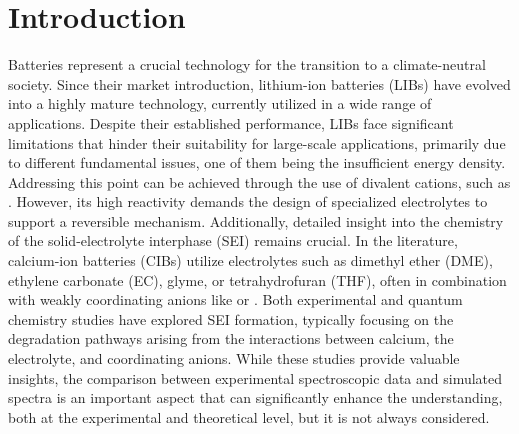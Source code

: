 \documentclass[%
aip,
amsmath,amssymb,
preprint,%
jcp,
showkeys,
]{revtex4-2}
\begin{document}
\clearpage
\section{Introduction}

Batteries represent a crucial technology for the transition to a climate-neutral society. Since their market introduction, lithium-ion batteries (LIBs) have evolved into a highly mature technology, currently utilized in a wide range of applications.\cite{zubiLithiumionBatteryState2018,kimLithiumionBatteriesOutlook2019} Despite their established performance, LIBs face significant limitations that hinder their suitability for large-scale applications, primarily due to different fundamental issues, one of them being the insufficient energy density.\cite{luReviewKeyIssues2013,li30YearsLithiumIon2018} Addressing this point can be achieved through the use of divalent cations, such as .\cite{arroyo-dedompabloAchievementsChallengesProspects2020,taghavi-kahaghPoweringFutureComprehensive2024} However, its high reactivity demands the design of specialized electrolytes to support a reversible mechanism. Additionally, detailed insight into the chemistry of the solid-electrolyte interphase (SEI) remains crucial.\cite{melemedImpactDifferentialCa22023,zhaoRevealingSolidElectrolyte2022}
In the literature, calcium-ion batteries (CIBs) utilize electrolytes such as dimethyl ether (DME), ethylene carbonate (EC), glyme, or tetrahydrofuran (THF), often in combination with weakly coordinating anions like  or  \cite{songElectrolyteOptimizationInterphase2022,zhaoRevealingSolidElectrolyte2022,bodinBoronBasedFunctionalAdditives2023}. 
Both experimental \cite{songElectrolyteOptimizationInterphase2022,melemedImpactDifferentialCa22023,bodinBoronBasedFunctionalAdditives2023} and quantum chemistry studies \cite{hahnCriticalRoleConfigurational2020,liepinyaComputationalComparisonEther2021,yamijalaStabilityCalciumIon2021} have explored SEI formation, typically focusing on the degradation pathways arising from the interactions between calcium, the electrolyte, and coordinating anions\cite{wuUnderstandingSolidElectrolyte2021,bodinBoronBasedFunctionalAdditives2023}. While these studies provide valuable insights, the comparison between experimental spectroscopic data and simulated spectra is an important aspect that can significantly enhance the understanding, both at the experimental and theoretical level, but it is not always considered.
\end{document}
